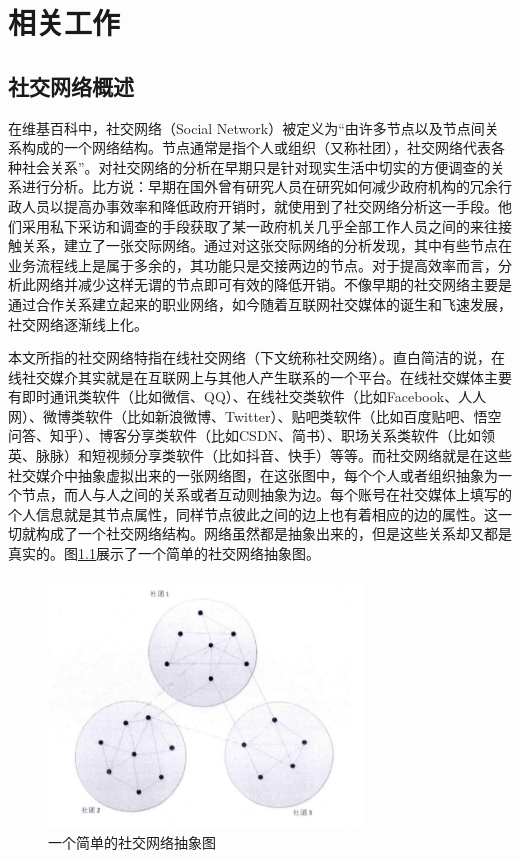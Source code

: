 \chapter{相关工作}
\section{社交网络概述}
在维基百科中，社交网络（Social Network）被定义为“由许多节点以及节点间关系构成的一个网络结构。节点通常是指个人或组织（又称社团），社交网络代表各种社会关系”。对社交网络的分析在早期只是针对现实生活中切实的方便调查的关系进行分析。比方说：早期在国外曾有研究人员在研究如何减少政府机构的冗余行政人员以提高办事效率和降低政府开销时，就使用到了社交网络分析这一手段。他们采用私下采访和调查的手段获取了某一政府机关几乎全部工作人员之间的来往接触关系，建立了一张交际网络。通过对这张交际网络的分析发现，其中有些节点在业务流程线上是属于多余的，其功能只是交接两边的节点。对于提高效率而言，分析此网络并减少这样无谓的节点即可有效的降低开销。不像早期的社交网络主要是通过合作关系建立起来的职业网络，如今随着互联网社交媒体的诞生和飞速发展，社交网络逐渐线上化。

本文所指的社交网络特指在线社交网络（下文统称社交网络）。直白简洁的说，在线社交媒介其实就是在互联网上与其他人产生联系的一个平台。在线社交媒体主要有即时通讯类软件（比如微信、QQ）、在线社交类软件（比如Facebook、人人网）、微博类软件（比如新浪微博、Twitter）、贴吧类软件（比如百度贴吧、悟空问答、知乎）、博客分享类软件（比如CSDN、简书）、职场关系类软件（比如领英、脉脉）和短视频分享类软件（比如抖音、快手）等等。而社交网络就是在这些社交媒介中抽象虚拟出来的一张网络图，在这张图中，每个个人或者组织抽象为一个节点，而人与人之间的关系或者互动则抽象为边。每个账号在社交媒体上填写的个人信息就是其节点属性，同样节点彼此之间的边上也有着相应的边的属性。这一切就构成了一个社交网络结构。网络虽然都是抽象出来的，但是这些关系却又都是真实的。图\ref{fig:fig2-1}展示了一个简单的社交网络抽象图。

\begin{figure}
  \centering
  \includegraphics[width=0.75\textwidth]{figures/fig2-1}
  \caption{一个简单的社交网络抽象图}\label{fig:fig2-1}
\end{figure}

